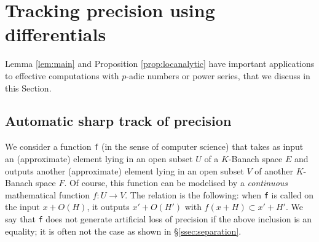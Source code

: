 \documentclass{lms}
\begin{document}

%
%

\section{Tracking precision using differentials}
\label{sec:tracking}

Lemma \ref{lem:main} and Proposition \ref{prop:locanalytic} have 
important applications to effective computations with $p$-adic numbers 
or power series, that we discuss in this Section. 

\subsection{Automatic sharp track of precision}

We consider a function {\tt f} (in the sense of computer 
science) that takes as input an (approximate) element lying in an open 
subset $U$ of a $K$-Banach space $E$ and outputs another (approximate) 
element lying in an open subset $V$ of another $K$-Banach space $F$. Of 
course, this function can be modelised by a \emph{continuous} 
mathematical function $f : U \to V$. The relation is the following: when 
{\tt f} is called on the input $x + O(H)$, it outputs $x' + O(H')$ with 
$f(x+H) \subset x' + H'$. We say that {\tt f} does not generate 
artificial loss of precision if the above inclusion is an equality; it is 
often not the case as shown in \S \ref{ssec:separation}.
\end{document}
